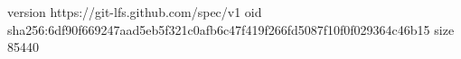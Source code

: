 version https://git-lfs.github.com/spec/v1
oid sha256:6df90f669247aad5eb5f321c0afb6c47f419f266fd5087f10f0f029364c46b15
size 85440
